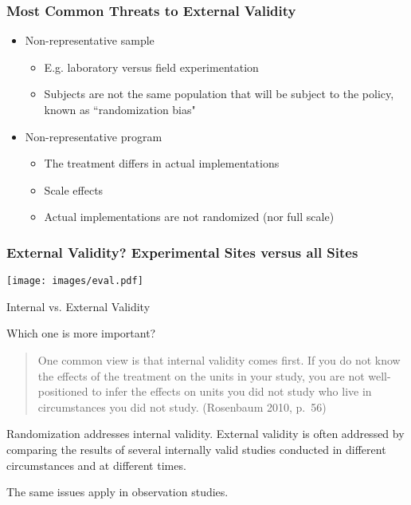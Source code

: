 \documentclass{beamer}
\numberwithin{equation}{section}
\begin{document}
\begin{frame}
  \frametitle{Most Common Threats to External Validity}
\begin{itemize}
 \item Non-representative sample
 \bigskip
  \begin{itemize}
   \item E.g. laboratory versus field experimentation\bigskip
   \item Subjects are not the same population that
     will be subject to the policy, known as ``randomization bias"
 \end{itemize}\bigskip
 \item Non-representative program\bigskip
  \begin{itemize}
   \item The treatment differs in actual implementations\bigskip
   \item Scale effects\bigskip
   \item Actual implementations are not randomized (nor full scale) \bigskip
  \end{itemize}
\end{itemize}
\end{frame}

\begin{frame}
  \frametitle{External Validity? Experimental Sites versus all Sites }
  \texttt{[image: images/eval.pdf]}
\end{frame}

\begin{frame}{Internal vs. External Validity}

Which one is more important?

\begin{quote}
One common view is that internal validity comes first. If you do not
know the effects of the treatment on the units in your study, you are
not well-positioned to infer the effects on units you did not study who
live in circumstances you did not study. (Rosenbaum 2010, p.~56)
\end{quote}

Randomization addresses internal validity. External validity is often
addressed by comparing the results of several internally valid studies
conducted in different circumstances and at different times.

The same issues apply in observation studies.

\end{frame}
\end{document}
